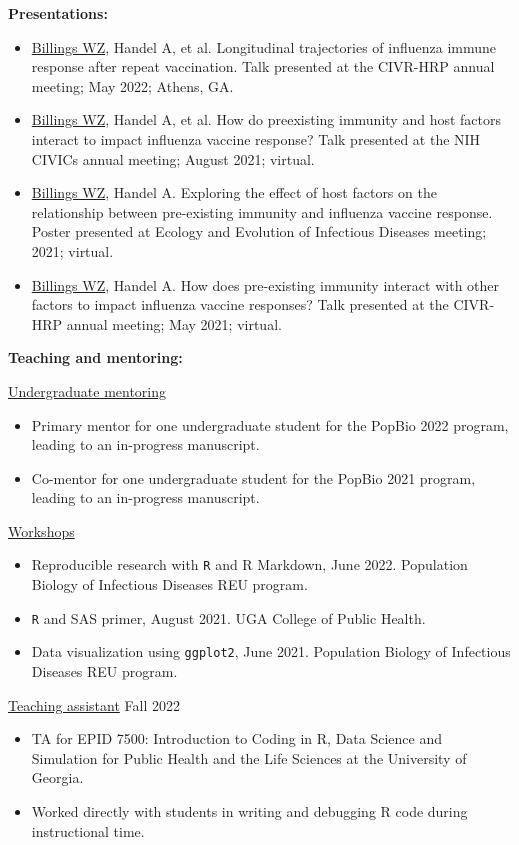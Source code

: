 \documentclass[11pt]{article}
\begin{document}
\vspace{0.2in}
\textbf{Presentations:}

\begin{itemize}[noitemsep]
\item \ul{Billings WZ}, Handel A, et al. Longitudinal trajectories of influenza immune response after repeat vaccination. Talk presented at the CIVR-HRP annual meeting; May 2022; Athens, GA.
\item \ul{Billings WZ}, Handel A, et al. How do preexisting immunity and host factors interact to impact influenza vaccine response? Talk presented at the NIH CIVICs annual meeting; August 2021; virtual.
\item \ul{Billings WZ}, Handel A. Exploring the effect of host factors on the relationship between pre-existing immunity and influenza vaccine response. Poster presented at Ecology and Evolution of Infectious Diseases meeting; 2021; virtual.
\item \ul{Billings WZ}, Handel A. How does pre-existing immunity interact with other factors to impact influenza vaccine responses? Talk presented at the CIVR-HRP annual meeting; May 2021; virtual.
\end{itemize}

\vfill\newpage
\textbf{Teaching and mentoring:}

\ul{Undergraduate mentoring}
\begin{itemize}
    \item Primary mentor for one undergraduate student for the PopBio 2022 program, leading to an in-progress manuscript.
    \item Co-mentor for one undergraduate student for the PopBio 2021 program, leading to an in-progress manuscript.
\end{itemize}

\ul{Workshops}
\begin{itemize}
    \item Reproducible research with \texttt{R} and R Markdown, June 2022. Population Biology of Infectious Diseases REU program.
    \item \texttt{R} and SAS primer, August 2021. UGA College of Public Health.
    \item Data visualization using \texttt{ggplot2}, June 2021. Population Biology of Infectious Diseases REU program.
\end{itemize}

\ul{Teaching assistant} \hfill Fall 2022
\begin{itemize}
    \item TA for EPID 7500: Introduction to Coding in R, Data Science and Simulation for Public Health and the Life Sciences at the University of Georgia.
    \item Worked directly with students in writing and debugging R code during instructional time.
\end{itemize}
\end{document}
